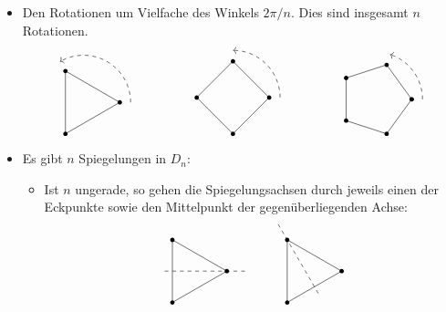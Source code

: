 \begin{itemize}
  \item
    Den Rotationen um Vielfache des Winkels $2\pi/n$.
    Dies sind insgesamt $n$ Rotationen.
    \[
      \begin{tikzpicture}
        \draw (0:1)
        \foreach \x in {120, 240, 360} {
          -- (\x:1)
        };
        \foreach \x in {120, 240, 360} {
          \fill[black] (\x:1) circle (0.06);
        }
        \draw[->,dashed] (0:1.3) arc[radius=1.3, start angle=0, end angle=120];
      \end{tikzpicture}
      \hspace{5em}
      \begin{tikzpicture}
        \draw (0:1)
        \foreach \x in {90, 180, 270, 360} {
          -- (\x:1)
        };
        \foreach \x in {90, 180, 270, 360} {
          \fill[black] (\x:1) circle (0.06);
        }
        \draw[->,dashed] (0:1.3) arc[radius=1.3, start angle=0, end angle=90];
      \end{tikzpicture}
      \hspace{5em}
      \begin{tikzpicture}
        \draw (0:1)
        \foreach \x in {0, 72, ..., 360} {
          -- (\x:1)
        };
        \foreach \x in {0, 72, ..., 360} {
          \fill[black] (\x:1) circle (0.06);
        }
        \draw[->,dashed] (0:1.3) arc[radius=1.3, start angle=0, end angle=72];
      \end{tikzpicture}
    \]
  \item
    Es gibt $n$ Spiegelungen in $D_n$:
    \begin{itemize}
      \item
        Ist $n$ ungerade, so gehen die Spiegelungsachsen durch jeweils einen der Eckpunkte sowie den Mittelpunkt der gegenüberliegenden Achse:
        \[
          \begin{tikzpicture}
            \draw (0:1)
            \foreach \x in {120, 240, 360} {
              -- (\x:1)
            };
            \foreach \x in {120, 240, 360} {
              \fill[black] (\x:1) circle (0.06);
            }
            \draw[dashed] (0:1.5) -- (180:0.8);
            \draw ([xshift=9em]0:1)
            \foreach \x in {120, 240, 360} {
              -- ([xshift=9em]\x:1)
            };
            \foreach \x in {120, 240, 360} {
              \fill[black] ([xshift=9em]\x:1) circle (0.06);
            }
            \draw[dashed] ([xshift=9em]120:1.5) -- ([xshift=9em]300:0.8);

\end{tikzpicture}\]
\end{itemize}
\end{itemize}
